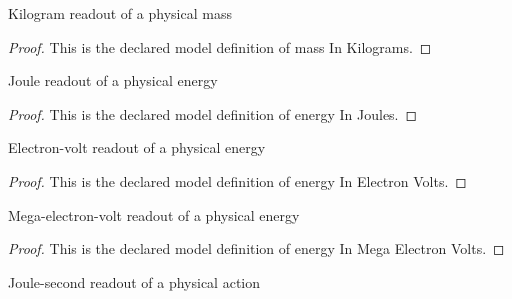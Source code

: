 \begin{definition}
  \label{def:physics:phyx-mini-0520:phyxminiproblems-problemphyxmini0520-massinkilograms}
  Kilogram readout of a physical mass
\end{definition}
\begin{proof}
  This is the declared model definition of mass In Kilograms.
\end{proof}
\begin{definition}
  \label{def:physics:phyx-mini-0520:phyxminiproblems-problemphyxmini0520-energyinjoules}
  Joule readout of a physical energy
\end{definition}
\begin{proof}
  This is the declared model definition of energy In Joules.
\end{proof}
\begin{definition}
  \label{def:physics:phyx-mini-0520:phyxminiproblems-problemphyxmini0520-energyinelectronvolts}
  Electron-volt readout of a physical energy
\end{definition}
\begin{proof}
  This is the declared model definition of energy In Electron Volts.
\end{proof}
\begin{definition}
  \label{def:physics:phyx-mini-0520:phyxminiproblems-problemphyxmini0520-energyinmegaelectronvolts}
  Mega-electron-volt readout of a physical energy
\end{definition}
\begin{proof}
  This is the declared model definition of energy In Mega Electron Volts.
\end{proof}
\begin{definition}
  \label{def:physics:phyx-mini-0520:phyxminiproblems-problemphyxmini0520-actioninjouleseconds}
  Joule-second readout of a physical action
\end{definition}
